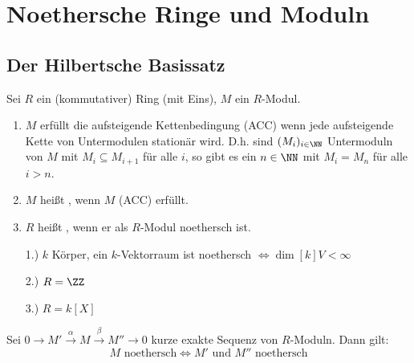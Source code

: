 \chapter{Noethersche Ringe und Moduln}

\section{Der Hilbertsche Basissatz}

\begin{Def}
  Sei $R$ ein (kommutativer) Ring (mit Eins), $M$ ein $R$-Modul.
  \begin{enumerate}
    \item $M$ erfüllt die aufsteigende Kettenbedingung (ACC) wenn jede
          aufsteigende Kette von Untermodulen stationär wird. D.h. sind
          $(M_i)_{i \in \NN}$ Untermoduln von $M$ mit $M_i \subseteq 
          M_{i+1}$ für alle $i$, so gibt es ein $n \in \NN$ mit $M_i =
          M_n$ für alle $i > n$.
    \item $M$ heißt , wenn $M$ (ACC) erfüllt.
    \item $R$ heißt , wenn er als $R$-Modul noethersch ist.
\end{enumerate}
\end{Def}

\begin{nnBsp}
  \begin{enumerate}
    \item[1.)] $k$ Körper, ein $k$-Vektorraum ist noethersch $\Leftrightarrow
                 \dim[k]{V} < \infty$
    \item[2.)] $R = \ZZ$
    \item[3.)] $R = k[X]$
  \end{enumerate}
\end{nnBsp}

\begin{Bem}
\label{2.2}
  Sei $0 \to M' \overset{\alpha}{\to} M \overset{\beta}{\to} M'' \to 0$ kurze
  exakte Sequenz von $R$-Moduln. Dann gilt:
  \[M \text{ noethersch} \Leftrightarrow M' \text{ und } M'' \text{ noethersch}\]
\end{Bem}


